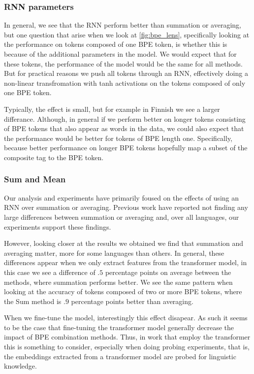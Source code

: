 \documentclass[11pt]{article}
\begin{document}
    \subsubsection{RNN parameters}
                In general, we see that the RNN perform better than
     summation or averaging, but one question that arise when we look
     at \cref{fig:bpe_lens}, specifically looking at the performance
     on tokens composed of one BPE token, is whether this is because
     of the additional parameters in the model. We would expect that
     for these tokens, the performance of the model would be the same
     for all methods. But for practical reasons we push all tokens
     through an RNN, effectively doing a non-linear transfromation
     with tanh activations on the tokens composed of only one BPE token.

        Typically, the effect is small, but for example in Finnish we
     see a larger differance. Although, in general if we perform
     better on longer tokens consisting of BPE tokens that also appear
     as words in the data, we could also expect that the performance
     would be better for tokens of BPE length one. Specifically,
     because better performance on longer BPE tokens hopefully map a
     subset of the composite tag to the BPE token.

    \subsubsection{Sum and Mean}

        Our analysis and experiments have primarily foused on the
     effects of using an RNN over summation or averaging. Previous
     work have reported not finding any large differences between
     summation or averaging and, over all languages, our experiments
     support these findings.

            However, looking closer at the results we obtained
     we find that summation and averaging matter, more for some
     languages than others. In general, these differences appear when
     we only extract features from the transformer model, in this case
     we see a difference of $.5$ percentage points on average between
     the methods, where summation performs better. We see the
     same pattern when looking at the accuracy of tokens composed of
     two or more BPE tokens, where the Sum method is $.9$ percentage
     points better than averaging.

             When we fine-tune the model, interestingly this effect
     disapear. As such it seems to be the case that fine-tuning the
     transformer model generally decrease the impact of BPE
     combination methods. Thus, in work that employ the transformer
     this is something to consider, especially when doing probing
     experiments, that is, the embeddings extracted from a transformer
     model are probed for linguistic knowledge.
\end{document}
